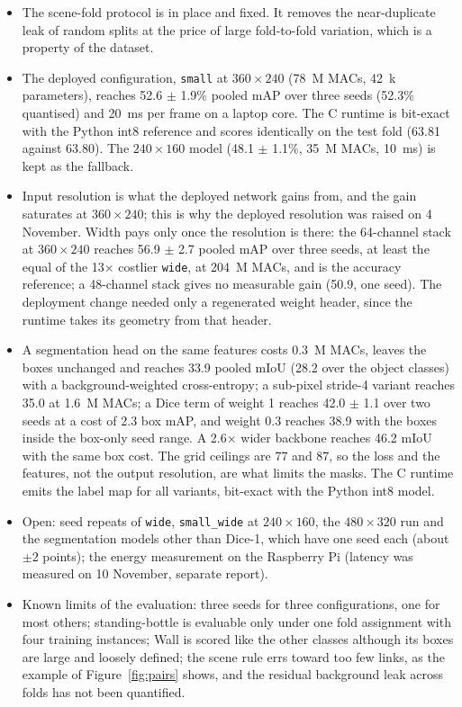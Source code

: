 \documentclass[11pt,a4paper]{article}
\newcommand{\cfg}[1]{\texttt{#1}}
\begin{document}
\begin{itemize}
  \item The scene-fold protocol is in place and fixed. It removes the
  near-duplicate leak of random splits at the price of large fold-to-fold
  variation, which is a property of the dataset.
  \item The deployed configuration, \cfg{small} at $360 \times 240$
  (78~M MACs, 42~k parameters), reaches 52.6 $\pm$ 1.9\% pooled mAP over
  three seeds (52.3\% quantised) and 20~ms per frame on a laptop core. The
  C runtime is bit-exact with the Python int8 reference and scores
  identically on the test fold (63.81 against 63.80). The $240 \times 160$
  model (48.1 $\pm$ 1.1\%, 35~M MACs, 10~ms) is kept as the fallback.
  \item Input resolution is what the deployed network gains from, and the
  gain saturates at $360 \times 240$; this is why the deployed resolution
  was raised on 4 November. Width pays only once the resolution is there:
  the 64-channel stack at $360 \times 240$ reaches 56.9 $\pm$ 2.7 pooled
  mAP over three seeds, at least the equal of the 13$\times$ costlier
  \cfg{wide}, at 204~M MACs, and is the accuracy reference; a 48-channel
  stack gives no measurable gain (50.9, one seed).
  The deployment change needed only a regenerated weight header, since the
  runtime takes its geometry from that header.
  \item A segmentation head on the same features costs 0.3~M MACs, leaves
  the boxes unchanged and reaches 33.9 pooled mIoU (28.2 over the object
  classes) with a background-weighted cross-entropy; a sub-pixel stride-4
  variant reaches 35.0 at 1.6~M MACs; a Dice term of weight 1 reaches
  42.0 $\pm$ 1.1 over two seeds at a cost of 2.3 box mAP, and weight 0.3
  reaches 38.9 with the boxes inside the box-only seed range. A 2.6$\times$
  wider backbone reaches 46.2 mIoU with the same box cost. The grid
  ceilings are 77 and 87, so the loss and the features, not the output
  resolution, are what limits the masks. The C runtime emits the label map
  for all variants, bit-exact with the Python int8 model.
  \item Open: seed repeats of \cfg{wide}, \cfg{small\_wide} at
  $240 \times 160$, the $480 \times 320$ run and the segmentation models
  other than Dice-1, which have one seed each (about $\pm 2$ points);
  the energy measurement on the Raspberry Pi (latency was measured on
  10 November, separate report).
  \item Known limits of the evaluation: three seeds for three
  configurations, one for most others;
  standing-bottle is evaluable only under one fold assignment with four
  training instances; Wall is scored like the other classes although its
  boxes are large and loosely defined; the scene rule errs toward too few
  links, as the example of Figure~\ref{fig:pairs} shows, and the residual
  background leak across folds has not been quantified.
\end{itemize}
\end{document}
